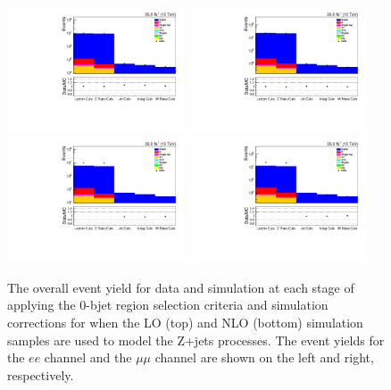 \begin{figure}[htbp]
\centering
\includegraphics[width=0.47\textwidth]{figs/background-estimation/plots/unblinded/DY_control_old_prompt_ee_ttbarInc/cutFlow_log.pdf}
\includegraphics[width=0.47\textwidth]{figs/background-estimation/plots/unblinded/DY_control_old_prompt_mumu_ttbarInc/cutFlow_log.pdf}
\\
\includegraphics[width=0.47\textwidth]{figs/background-estimation/plots/unblinded/DY_control_old_prompt_ee_DYamcatnlo/cutFlow_log.pdf}
\includegraphics[width=0.47\textwidth]{figs/background-estimation/plots/unblinded/DY_control_old_prompt_mumu_DYamcatnlo/cutFlow_log.pdf}
\caption{
The overall event yield for data and simulation at each stage of applying the 0-bjet region selection criteria and simulation corrections for when the LO (top) and NLO (bottom) simulation samples are used to model the Z+jets processes.
The event yields for the $ee$ channel and the $\mu\mu$ channel are shown on the left and right, respectively.
}
\label{fig:zPlus_cutFlow}
\end{figure}

